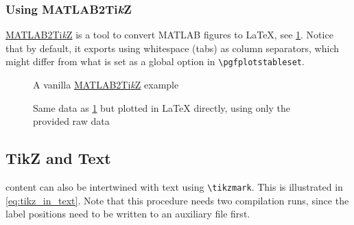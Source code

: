 \subsubsection{Using MATLAB2Ti\textit{k}Z}

\href{https://github.com/matlab2tikz/matlab2tikz}{MATLAB2Ti\textit{k}Z} is a tool to
convert MATLAB figures to \LaTeX{}, see \cref{fig:matlab2tikz_vanilla}.
Notice that by default, it exports using whitespace (tabs) as column separators,
which might differ from what is set as a global option in \verb|\pgfplotstableset|.

\begin{figure}[tbp]
\ContinuedFloat*
    \centering
    \caption[MATLAB2Ti\textit{k}Z example]{%
        A vanilla \href{https://github.com/matlab2tikz/matlab2tikz}{MATLAB2Ti\textit{k}Z}
        example%
    }
    \label{fig:matlab2tikz_vanilla}
\end{figure}

\begin{figure}[tbp]
\ContinuedFloat
    \centering
    \caption[Plotting in \LaTeX{} with provided data]{%
        Same data as \cref{fig:matlab2tikz_vanilla} but plotted in \LaTeX{} directly, using only the provided raw data%
    }
    \label{fig:matlab2tikz_pgfplots}
\end{figure}

\subsection{TikZ and Text}

 content can also be intertwined with text using \verb|\tikzmark|.
This is illustrated in \cref{eq:tikz_in_text}.
Note that this procedure needs two compilation runs, since the label positions
need to be written to an auxiliary file first.

